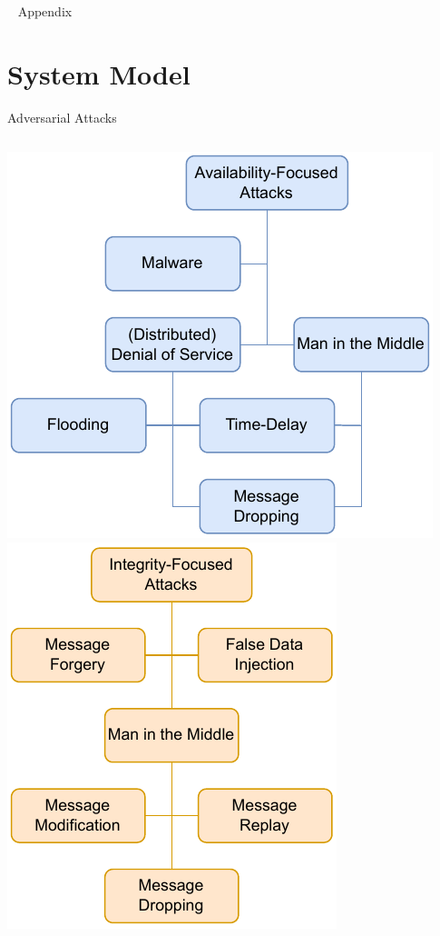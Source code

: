 \documentclass[en]{sdqbeamer}
\begin{document}
\appendix
\beginbackup
\begin{frame}{~}
    \centering
    \Huge
    Appendix
\end{frame}
\section{System Model}
\begin{frame}{Adversarial Attacks}
    \begin{columns}
        \centering
        \includegraphics[width=\linewidth]{figures/attacks_availability.drawio.pdf}
        \centering
        \includegraphics[width=\linewidth]{figures/attacks_integrity.drawio.pdf}

\end{columns}
\end{frame}
\end{document}
